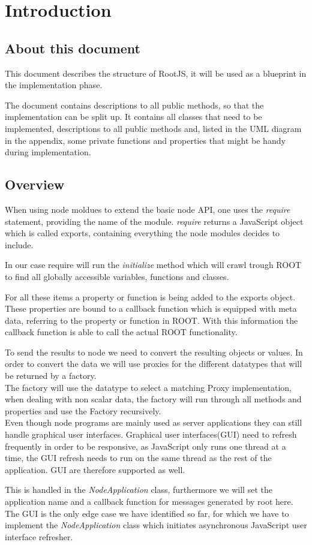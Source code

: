 \chapter{Introduction}
\section{About this document}
This document describes the structure of RootJS, it will be used as a blueprint in the implementation phase.

The document contains descriptions to all public methods, so that the implementation can be split up. It contains all classes that need to be implemented, descriptions to all public methods and, listed in the UML diagram in the appendix, some private functions and properties that might be handy during implementation.

\section{Overview}
When using node moldues to extend the basic node API, one uses the \textit{require} statement, providing the name of the module.
\textit{require} returns a JavaScript object which is called exports, containing everything the node modules decides to include.

In our case require will run the \textit{initialize} method which will crawl trough ROOT to find all globally accessible variables, functions and classes.

For all these items a property or function is being added to the exports object.
These properties are bound to a callback function which is equipped with meta data, referring to the property or function in ROOT.
With this information the callback function is able to call the actual ROOT functionality.

To send the results to node we need to convert the resulting objects or values.
In order to convert the data we will use proxies for the different datatypes that will be returned by a factory.\\

The factory will use the datatype to select a matching Proxy implementation, when dealing with non scalar data, the factory will run through all methods and properties and use the Factory recursively.\\

Even though node programs are mainly used as server applications they can still handle graphical user interfaces.
Graphical user interfaces(GUI) need to refresh frequently in order to be responsive, as JavaScript only runs one thread at a time, the GUI refresh needs to run on the same thread as the rest of the application. GUI are therefore supported as well. 

This is handled in the \textit{NodeApplication} class, furthermore we will set the application name and a callback function for messages generated by root here. The GUI is the only edge case we have identified so far, for which we have to implement the \textit{NodeApplication} class which initiates asynchronous JavaScript user interface refresher. 
